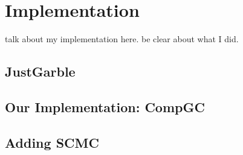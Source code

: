 \chapter{Implementation}

talk about my implementation here.
be clear about what I did.

\section{JustGarble}
\section{Our Implementation: CompGC}
\section{Adding SCMC}

